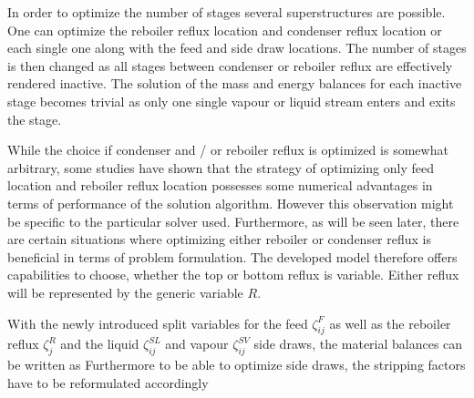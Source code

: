         In order to optimize the number of stages several superstructures are possible. One can
        optimize the reboiler reflux location and condenser reflux location or each single one
        along with the feed and side draw locations. The number of stages is then changed as all stages
        between condenser or reboiler reflux are effectively rendered inactive. The solution of
        the mass and energy balances for each inactive stage becomes trivial as only one single
        vapour or liquid stream enters and exits the stage.

        While the choice if condenser and / or reboiler
        reflux is optimized is somewhat arbitrary, some studies have shown \cite{Grossmann.2005} that
        the strategy of optimizing only feed location and reboiler reflux location possesses some
        numerical advantages in terms of performance of the solution algorithm. However this observation
        might be specific to the particular solver used. Furthermore, as will be seen later, there are
        certain situations where optimizing either reboiler or condenser reflux is beneficial in terms of
        problem formulation. The developed model therefore offers capabilities to choose, whether the top
        or bottom reflux is variable. Either reflux will be represented by the generic variable $R$.

        With the newly introduced split variables for the feed $\zeta^F_{ij}$
        as well as the reboiler reflux $\zeta^R_j$ and the liquid $\zeta^{SL}_{ij}$ and vapour $\zeta^{SV}_{ij}$
        side draws, the material balances can be written as
        Furthermore to be able to optimize side draws, the stripping factors have to be reformulated
        accordingly
